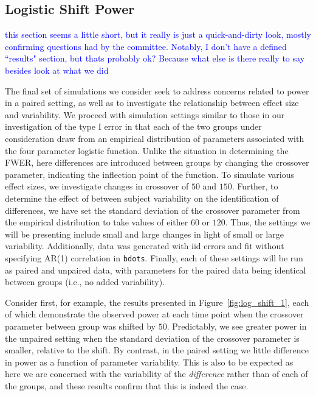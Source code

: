 \documentclass{article}
\newcommand{\xt}{\texttt}
\providecommand{\cn}[1]{\textcolor{blue}{#1}}
\begin{document}
\subsection{Logistic Shift Power}

\cn{this section seems a little short, but it really is just a quick-and-dirty look, mostly confirming questions had by the committee. Notably, I don't have a defined ``results" section, but thats probably ok? Because what else is there really to say besides look at what we did}

The final set of simulations we consider seek to address concerns related to power in a paired setting, as well as to investigate the relationship between effect size and variability. We proceed with simulation settings similar to those in our investigation of the type I error in that each of the two groups under consideration draw from an empirical distribution of parameters associated with the four parameter logistic function. Unlike the situation in determining the FWER, here differences are introduced between groups by changing the crossover parameter, indicating the inflection point of the function. To simulate various effect sizes, we investigate changes in crossover of $50$ and $150$. Further, to determine the effect of between subject variability on the identification of differences, we have set the standard deviation of the crossover parameter from the empirical distribution to take values of either $60$ or $120$. Thus, the settings we will be presenting include small and large changes in light of small or large variability. Additionally, data was generated with iid errors and fit without specifying AR(1) correlation in \xt{bdots}. Finally, each of these settings will be run as paired and unpaired data, with parameters for the paired data being identical between groups (i.e., no added variability). 


Consider first, for example, the results presented in Figure~\ref{fig:log_shift_1}, each of which demonstrate the observed power at each time point when the crossover parameter between group was shifted by $50$. Predictably, we see greater power in the unpaired setting when the standard deviation of the crossover parameter is smaller, relative to the shift. By contrast, in the paired setting we little difference in power as a function of parameter variability. This is also to be expected as here we are concerned with the variability of the \textit{difference} rather than of each of the groups, and these results confirm that this is indeed the case. 
\end{document}
